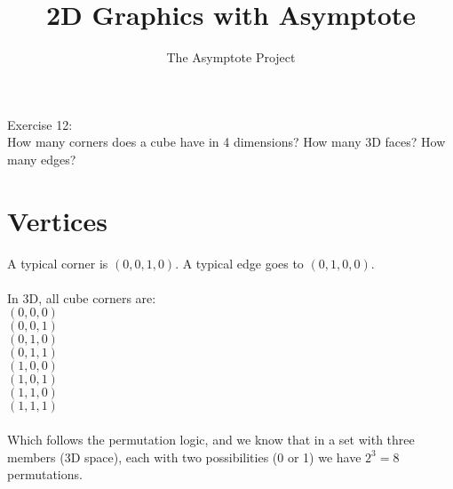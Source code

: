 \documentclass[12pt]{article}
\title{2D Graphics with Asymptote}
\author{The Asymptote Project}
\begin{document}
	Exercise 12:\\
	How many corners does a cube have in 4 dimensions? How many 3D faces? How many edges?
	
	\section{Vertices}
	A typical corner is $(0,0,1,0)$. A typical edge goes to $(0,1,0,0)$.\\
	\\
	In 3D, all cube corners are:\\
	$(0,0,0)$\\
	$(0,0,1)$\\
	$(0,1,0)$\\
	$(0,1,1)$\\
	$(1,0,0)$\\
	$(1,0,1)$\\
	$(1,1,0)$\\
	$(1,1,1)$\\
	\\
	Which follows the permutation logic, and we know that in a set with three members (3D space), each with two possibilities (0 or 1) we have $2^3=8$ permutations.\\
	
\end{document}
